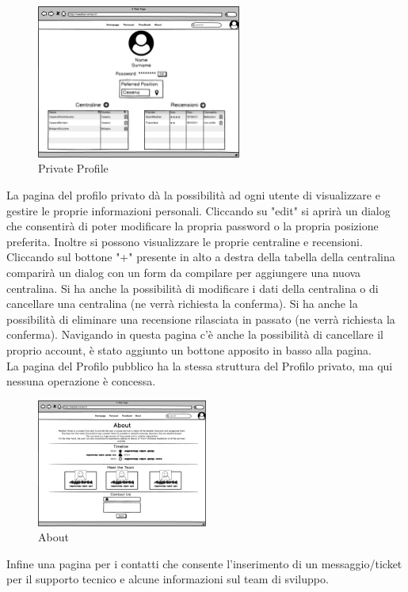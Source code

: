 \begin{figure}[H]
    \caption{Private Profile}
    \label{fig:PrivateProfile}
    \centering
    \includegraphics[width=0.6\textwidth]{MockUps/Private Profile.png}
\end{figure}
La pagina del profilo privato dà la possibilità ad ogni utente di visualizzare e gestire le proprie informazioni personali. Cliccando su "edit" si aprirà un dialog che consentirà di poter modificare la propria password o la propria posizione preferita.
Inoltre si possono visualizzare le proprie centraline e recensioni.
Cliccando sul bottone "+" presente in alto a destra della tabella della centralina comparirà un dialog con un form da compilare per aggiungere una nuova centralina.  
Si ha anche la possibilità di modificare i dati della centralina o di cancellare una centralina (ne verrà richiesta la conferma). 
Si ha anche la possibilità di eliminare una recensione rilasciata in passato (ne verrà richiesta la conferma).
Navigando in questa pagina c'è anche la possibilità di cancellare il proprio account, è stato aggiunto un bottone apposito in basso alla pagina.\\

La pagina del Profilo pubblico ha la stessa struttura del Profilo privato, ma qui nessuna operazione è concessa. 

\begin{figure}[H]
    \caption{About}
    \label{fig:About}
    \centering
    \includegraphics[width=0.5\textwidth]{MockUps/about.png}
\end{figure}
Infine una pagina per i contatti che consente l'inserimento di un messaggio/ticket
per il supporto tecnico e alcune informazioni sul team di sviluppo.
